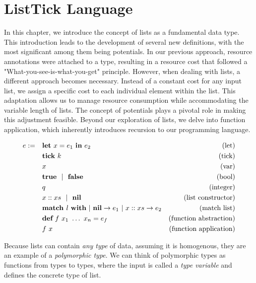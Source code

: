 \chapter{ListTick Language}\label{chap:list-tick}

In this chapter, we introduce the concept of lists as a fundamental data type. This introduction leads to the development of several new definitions, with the most significant among them being potentials. In our previous approach, resource annotations were attached to a type, resulting in a resource cost that followed a "What-you-see-is-what-you-get" principle. However, when dealing with lists, a different approach becomes necessary. Instead of a constant cost for any input list, we assign a specific cost to each individual element within the list. This adaptation allows us to manage resource consumption while accommodating the variable length of lists. The concept of potentials plays a pivotal role in making this adjustment feasible. Beyond our exploration of lists, we delve into function application, which inherently introduces recursion to our programming language. 

\begin{definition}
   \label{def:prog-lang-6}

\begin{align*}
   e := ~~~ & \mathbf{let}~x = e_1~\mathbf{in}~e_2		& \text{(let)}\\
            & \mathbf{tick}~k				& \text{(tick)}\\
	    & x					& \text{(var)}\\
	    & \mathbf{true} ~~| ~~\mathbf{false}		& \text{(bool)}\\
	    & q					& \text{(integer)}\\
            & x :: xs ~~| ~~ \textbf{nil}      & \text{(list constructor)}\\
            & \textbf{match } l~\textbf{with}~|~\textbf{nil} \to e_1~|~x :: xs \to e_2           & \text{(match list)}\\
            & \textbf{def}~f~x_1~\dots~x_n = e_f       & \text{(function abstraction)}\\
            & f~x                               & \text{(function application)}\\
\end{align*}
\end{definition}

Because lists can contain \emph{any type} of data, assuming it is homogenous, they are an example of a \emph{polymorphic type}. We can think of polymorphic types as functions from types to types, where the input is called a \emph{type variable} and defines the concrete type of list. 

